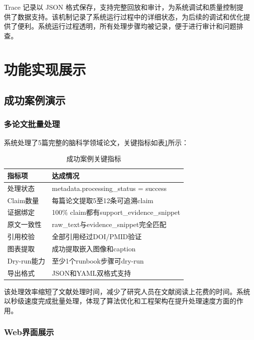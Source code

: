 ﻿\documentclass[a4paper,12pt]{article}
\begin{document}
Trace 记录以 JSON 格式保存，支持完整回放和审计，为系统调试和质量控制提供了数据支持。该机制记录了系统运行过程中的详细状态，为后续的调试和优化提供了便利。系统运行过程透明，所有处理步骤均被记录，便于进行审计和问题排查。

\section{功能实现展示}

\subsection{成功案例演示}

\subsubsection{多论文批量处理}

系统处理了5篇完整的脑科学领域论文，关键指标如表\ref{tab:success_metrics}所示：

\begin{table}[H]
\centering
\caption{成功案例关键指标}
\label{tab:success_metrics}
\begin{tabular}{p{4cm}p{8cm}}
\toprule
\textbf{指标项} & \textbf{达成情况} \\
\midrule
处理状态 & metadata.processing\_status = success \\
Claim数量 & 每篇论文提取5至12条可追溯claim \\
证据绑定 & 100\% claim都有support\_evidence\_snippet \\
原文一致性 & raw\_text与evidence\_snippet完全匹配 \\
引用校验 & 全部引用经过DOI/PMID验证 \\
图表提取 & 成功提取嵌入图像和caption \\
Dry-run能力 & 至少1个runbook步骤可dry-run \\
导出格式 & JSON和YAML双格式支持 \\
\bottomrule
\end{tabular}
\end{table}

该处理效率缩短了文献处理时间，减少了研究人员在文献阅读上花费的时间。系统以秒级速度完成批量处理，体现了算法优化和工程架构在提升处理速度方面的作用。

\subsubsection{Web界面展示}
\end{document}
